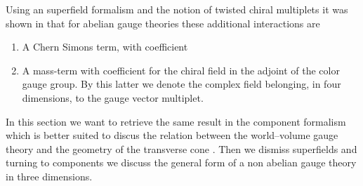 \documentclass[a4paper,12pt]{article}
\begin{document}
Using an \coordHE{} superfield formalism and the notion of twisted
chiral multiplets it was shown in \cite{kapustin} that for abelian
gauge theories these additional \coordHE{} interactions are
\begin{enumerate}
  \item A Chern Simons term, with coefficient \myHighlight{$\alpha$}\coordHE{}
  \item A mass-term  with coefficient \myHighlight{$\mu=\alpha$}\coordHE{} for the
  chiral field \coordHE{} in the adjoint of the color gauge group.
  By this latter we denote the complex field belonging,
  in four dimensions, to the \coordHE{} gauge
  vector multiplet.
\end{enumerate}
In this section we want to retrieve the same result in the
component formalism which is better suited to discus the relation
between the world--volume gauge theory and the geometry of the
transverse cone \coordHE{}.
Then we dismiss superfields and turning to components we discuss
the general form of a non abelian \coordHE{} gauge theory in
three dimensions.
\end{document}
